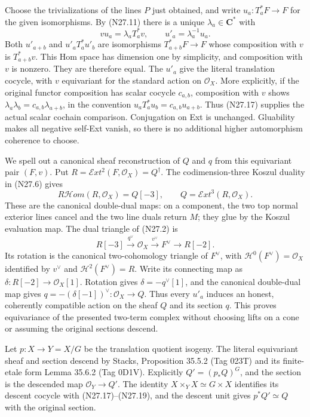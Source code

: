 Choose the trivializations of the lines $P$ just obtained,
and write $u_a:T_a^*F\to F$ for the given isomorphisms.
By (N27.11) there is a unique $\lambda_a\in\mathbf C^*$
with
\[
                  v u_a=\lambda_a T_a^*v,
                    \qquad u'_a=\lambda_a^{-1}u_a.       \tag{N27.17}
\]
Both $u'_{a+b}$ and $u'_aT_a^*u'_b$ are isomorphisms
$T_{a+b}^*F\to F$ whose composition with $v$ is
$T_{a+b}^*v$. This Hom space has dimension one by
simplicity, and composition with $v$ is nonzero. They
are therefore equal. The $u'_a$ give the literal
translation cocycle, with $v$ equivariant for the standard
action on $\mathcal O_X$.
More explicitly, if the original functor composition
has scalar cocycle $c_{a,b}$, composition with $v$ shows
$\lambda_a\lambda_b=c_{a,b}\lambda_{a+b}$, in the
convention $u_aT_a^*u_b=c_{a,b}u_{a+b}$.
Thus (N27.17) supplies the actual scalar cochain comparison.
Conjugation on Ext is unchanged. Gluability makes all
negative self-Ext vanish, so there is no additional higher
automorphism coherence to choose.

We spell out a canonical sheaf reconstruction of $Q$ and
$q$ from this equivariant pair $(F,v)$. Put
$R=\mathcal E xt^2(F,\mathcal O_X)=Q^\dagger$.
The codimension-three Koszul duality in (N27.6) gives
\[
             R\mathcal H om(R,\mathcal O_X)=Q[-3],
                    \qquad Q=\mathcal E xt^3(R,\mathcal O_X).
                                                               \tag{N27.18}
\]
These are the canonical double-dual maps: on a component,
the two top normal exterior lines cancel and the two
line duals return $M$; they glue by the Koszul evaluation
map. The dual triangle of (N27.2) is
\[
             R[-3]\xrightarrow{q^\vee}\mathcal O_X
                  \xrightarrow{v^\vee}F^\vee
                  \longrightarrow R[-2].                \tag{N27.19}
\]
Its rotation is the canonical two-cohomology triangle of
$F^\vee$, with $\mathcal H^0(F^\vee)=\mathcal O_X$
identified by $v^\vee$ and $\mathcal H^2(F^\vee)=R$.
Write its connecting map as
$\delta:R[-2]\to\mathcal O_X[1]$. Rotation gives
$\delta=-q^\vee[1]$, and the canonical double-dual map gives
$q=-(\delta[-1])^\vee:\mathcal O_X\to Q$.
Thus every $u'_a$
induces an honest, coherently compatible action on the
sheaf $Q$ and its section $q$. This proves equivariance
of the presented two-term complex without choosing lifts
on a cone or assuming the original sections descend.

Let $p:X\to Y=X/G$ be the translation quotient isogeny.
The literal equivariant sheaf and section descend by
Stacks, Proposition 35.5.2 (Tag 023T) and its finite-etale
form Lemma 35.6.2 (Tag 0D1V). Explicitly
$Q'=(p_*Q)^G$, and the section is the descended map
$\mathcal O_Y\to Q'$. The identity
$X\times_YX\simeq G\times X$ identifies its descent
cocycle with (N27.17)--(N27.19), and the descent unit gives
$p^*Q'\simeq Q$ with the original section.

